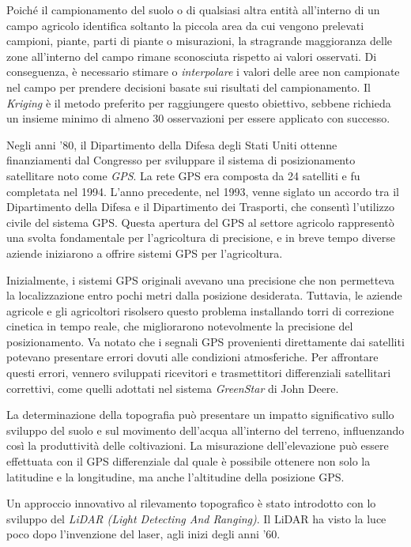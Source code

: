 Poiché il campionamento del suolo o di qualsiasi altra entità all'interno di un campo agricolo identifica soltanto la piccola area da cui vengono prelevati campioni, piante, parti di piante o misurazioni, la stragrande maggioranza delle zone all'interno del campo rimane sconosciuta rispetto ai valori osservati. Di conseguenza, è necessario stimare o \textit{interpolare} i valori delle aree non campionate nel campo per prendere decisioni basate sui risultati del campionamento. Il \textit{Kriging} è il metodo preferito per raggiungere questo obiettivo, sebbene richieda un insieme minimo di almeno 30 osservazioni per essere applicato con successo.

Negli anni '80, il Dipartimento della Difesa degli Stati Uniti ottenne finanziamenti dal Congresso per sviluppare il sistema di posizionamento satellitare noto come \textit{GPS}. La rete GPS era composta da 24 satelliti e fu completata nel 1994. L'anno precedente, nel 1993, venne siglato un accordo tra il Dipartimento della Difesa e il Dipartimento dei Trasporti, che consentì l'utilizzo civile del sistema GPS. Questa apertura del GPS al settore agricolo rappresentò una svolta fondamentale per l'agricoltura di precisione, e in breve tempo diverse aziende iniziarono a offrire sistemi GPS per l'agricoltura.

Inizialmente, i sistemi GPS originali avevano una precisione che non permetteva la localizzazione entro pochi metri dalla posizione desiderata. Tuttavia, le aziende agricole e gli agricoltori risolsero questo problema installando torri di correzione cinetica in tempo reale, che migliorarono notevolmente la precisione del posizionamento. Va notato che i segnali GPS provenienti direttamente dai satelliti potevano presentare errori dovuti alle condizioni atmosferiche. Per affrontare questi errori, vennero sviluppati ricevitori e trasmettitori differenziali satellitari correttivi, come quelli adottati nel sistema \textit{GreenStar} di John Deere.

La determinazione della topografia può presentare un impatto significativo sullo sviluppo del suolo e sul movimento dell'acqua all'interno del terreno, influenzando così la produttività delle coltivazioni. La misurazione dell'elevazione può essere effettuata con il GPS differenziale dal quale è possibile ottenere non solo la latitudine e la longitudine, ma anche l'altitudine della posizione GPS.

Un approccio innovativo al rilevamento topografico è stato introdotto con lo sviluppo del \textit{LiDAR (Light Detecting And Ranging)}. Il LiDAR ha visto la luce poco dopo l'invenzione del laser, agli inizi degli anni '60.

